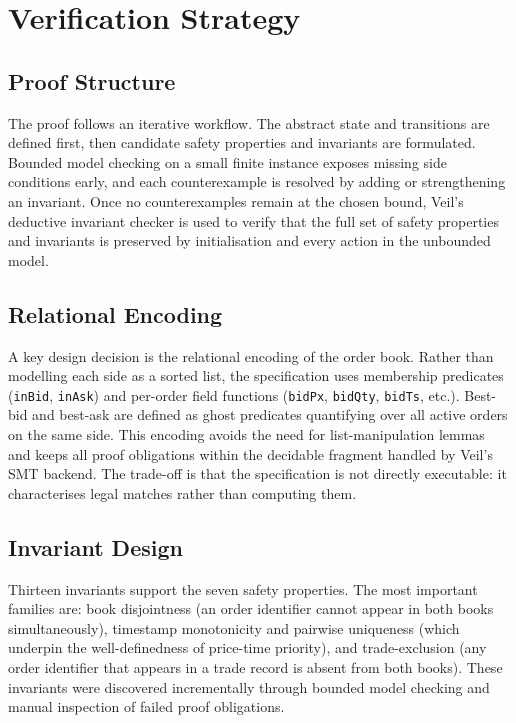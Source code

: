 \section{Verification Strategy}

\subsection{Proof Structure}

The proof follows an iterative workflow. The abstract state and transitions
are defined first, then candidate safety properties and invariants are
formulated. Bounded model checking on a small finite instance exposes missing
side conditions early, and each counterexample is resolved by adding or
strengthening an invariant. Once no counterexamples remain at the chosen bound,
Veil's deductive invariant checker is used to verify that the full set of
safety properties and invariants is preserved by initialisation and every
action in the unbounded model.

\subsection{Relational Encoding}

A key design decision is the relational encoding of the order book. Rather
than modelling each side as a sorted list, the specification uses membership
predicates (\texttt{inBid}, \texttt{inAsk}) and per-order field functions
(\texttt{bidPx}, \texttt{bidQty}, \texttt{bidTs}, etc.). Best-bid and
best-ask are defined as ghost predicates quantifying over all active orders on
the same side. This encoding avoids the need for list-manipulation lemmas and
keeps all proof obligations within the decidable fragment handled by Veil's
SMT backend. The trade-off is that the specification is not directly
executable: it characterises legal matches rather than computing them.

\subsection{Invariant Design}

Thirteen invariants support the seven safety properties. The most important
families are: book disjointness (an order identifier cannot appear in both
books simultaneously), timestamp monotonicity and pairwise uniqueness (which
underpin the well-definedness of price-time priority), and trade-exclusion
(any order identifier that appears in a trade record is absent from both
books). These invariants were discovered incrementally through bounded model
checking and manual inspection of failed proof obligations.
